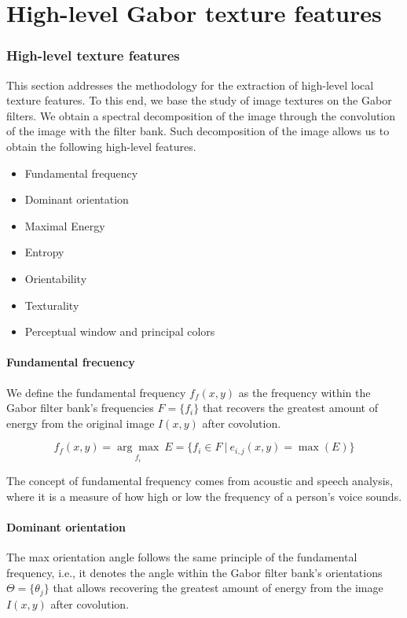 
\chapter{High-level Gabor texture features}\label{ch:high_level_features}

\subsection{High-level texture features}
This section addresses the methodology for the extraction of high-level local texture features. To this end, we base the study of image textures on the Gabor filters. We obtain a spectral decomposition of the image through the convolution of the image with the filter bank. Such decomposition of the image allows us to obtain the following high-level features.

\begin{itemize}
	\item Fundamental frequency
	\item Dominant orientation
	\item Maximal Energy
	\item Entropy
	\item Orientability
	\item Texturality 
	\item Perceptual window and principal colors
\end{itemize}

\subsubsection{Fundamental frecuency}
We define the fundamental frequency $f_{f}(x,y)$ as the frequency within the Gabor filter bank's frequencies  $F=\lbrace f_i \rbrace$ that recovers the greatest amount of energy from the original image $I(x,y)$ after covolution. 

\begin{equation}
	f_{f}(x,y) =  \underset{f_{i}}{\arg\max} ~ E = \lbrace f_{i} \in F ~|~ e_{i,j}(x,y) = \max(E)\rbrace  \label{eq:fundamental_freq}
\end{equation}

The concept of fundamental frequency comes from acoustic and speech analysis, where it is a measure of how high or low the frequency of a person's voice sounds.

\subsubsection{Dominant orientation}
The max orientation angle follows the same principle of the fundamental frequency, i.e., it denotes the angle within the Gabor filter bank's orientations $\Theta=\lbrace \theta_j \rbrace$ that allows recovering the greatest amount of energy from the image $I(x, y)$ after covolution.

